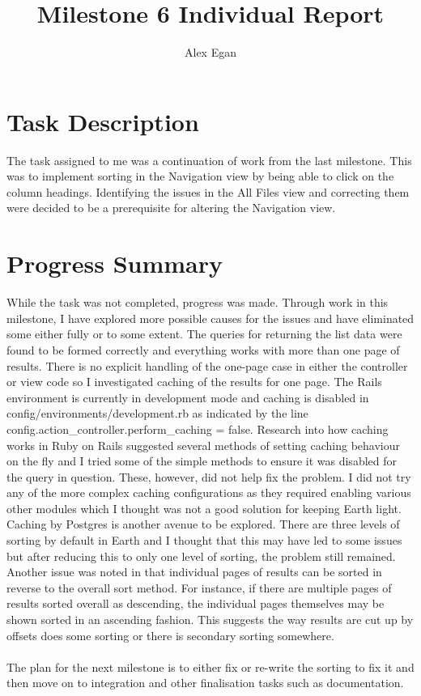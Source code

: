 \documentclass[10pt, a4]{article}
\begin{document}
\title{Milestone 6 Individual Report}
\author{Alex Egan}
\date{ }

\maketitle
 
\section{Task Description}
The task assigned to me was a continuation of work from the last milestone. This was to implement sorting in the Navigation view by being able to click on the column headings. Identifying the issues in the All Files view and correcting them were decided to be a prerequisite for altering the Navigation view.

\section{Progress Summary}
\label{prog-sum}
While the task was not completed, progress was made. Through work in this milestone, I have explored more possible causes for the issues and have eliminated some either fully or to some extent. The queries for returning the list data were found to be formed correctly and everything works with more than one page of results. There is no explicit handling of the one-page case in either the controller or view code so I investigated caching of the results for one page. The Rails environment is currently in development mode and caching is disabled in config/environments/development.rb as indicated by the line config.action\_controller.perform\_caching = false. Research into how caching works in Ruby on Rails suggested several methods of setting caching behaviour on the fly and I tried some of the simple methods to ensure it was disabled for the query in question. These, however, did not help fix the problem. I did not try any of the more complex caching configurations as they required enabling various other modules which I thought was not a good solution for keeping Earth light. Caching by Postgres is another avenue to be explored. There are three levels of sorting by default in Earth and I thought that this may have led to some issues but after reducing this to only one level of sorting, the problem still remained. Another issue was noted in that individual pages of results can be sorted in reverse to the overall sort method. For instance, if there are multiple pages of results sorted overall as descending, the individual pages themselves may be shown sorted in an ascending fashion. This suggests the way results are cut up by offsets does some sorting or there is secondary sorting somewhere.\\
\\
The plan for the next milestone is to either fix or re-write the sorting to fix it and then move on to integration and other finalisation tasks such as documentation.
\end{document}
